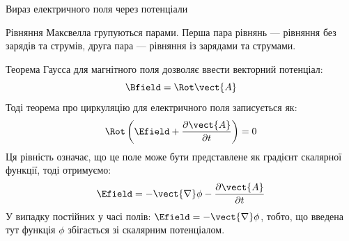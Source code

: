 \documentclass{beamer}
\begin{document}
\begin{frame}{Вираз електричного поля через потенціали}{}
	\renewcommand{\baselinestretch}{0.99}
	\begin{block}{}\justifying
		Рівняння Максвелла групуються парами. \alert{Перша пара рівнянь} --- рівняння \alert{без зарядів та струмів}, \alert{друга пара} --- рівняння
		\alert{із зарядами та струмами}.
	\end{block}
	\begin{block}{}
		Теорема Гаусса для магнітного поля дозволяє ввести векторний потенціал:
		\begin{equation*}
			\Bfield=\Rot\vect{A}
		\end{equation*}
		Тоді теорема про циркуляцію для електричного поля записується як:
		\begin{equation*}
			\Rot\left(\Efield  + \frac{\partial\vect{A}}{\partial t}\right) = 0
		\end{equation*}
		Ця рівність означає, що це
		поле може бути представлене як градієнт скалярної функції, тоді отримуємо:
		\begin{equation*}
			\Efield = -\vect{\nabla}\phi - \frac{\partial\vect{A}}{\partial t}
		\end{equation*}
		У випадку постійних у часі полів: $\Efield = -\vect{\nabla}\phi $, тобто, що введена тут функція $\phi$
		збігається зі скалярним потенціалом.
	\end{block}
\end{frame}
\end{document}
